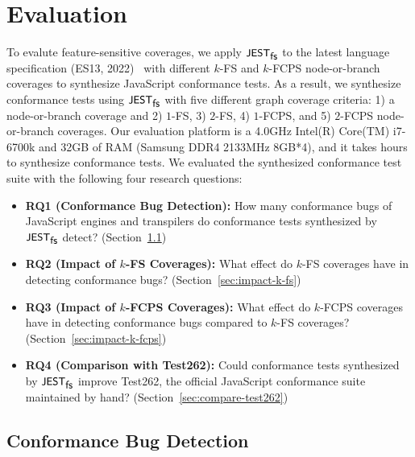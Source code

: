 \section{Evaluation}\label{sec:eval}

To evalute feature-sensitive coverages, we apply $\textsf{\small JEST}_{\textsf{\small fs}}$ to the latest language
specification (ES13, 2022)~\cite{es13} with different $k$-FS and $k$-FCPS
node-or-branch coverages to synthesize JavaScript conformance tests.
%
As a result, we synthesize  conformance tests using $\textsf{\small JEST}_{\textsf{\small fs}}$ with
five different graph coverage criteria: 1) a node-or-branch coverage and 2)
$1$-FS, 3) $2$-FS, 4) $1$-FCPS, and 5) $2$-FCPS node-or-branch coverages.
%
Our evaluation platform is a 4.0GHz Intel(R) Core(TM) i7-6700k and 32GB of RAM
(Samsung DDR4 2133MHz 8GB*4), and it takes  hours to synthesize
conformance tests.
%
We evaluated the synthesized conformance test suite with the following four
research questions:
\begin{itemize}
  \item \textbf{RQ1 (Conformance Bug Detection):} How many conformance bugs of
    JavaScript engines and transpilers do conformance tests synthesized by
    $\textsf{\small JEST}_{\textsf{\small fs}}$ detect? (Section~\ref{sec:conform-bug})
  \item \textbf{RQ2 (Impact of $k$-FS Coverages):} What effect do $k$-FS
    coverages have in detecting conformance bugs?
    (Section~\ref{sec:impact-k-fs})
  \item \textbf{RQ3 (Impact of $k$-FCPS Coverages):} What effect do $k$-FCPS
    coverages have in detecting conformance bugs compared to $k$-FS coverages?
    (Section~\ref{sec:impact-k-fcps})
  \item \textbf{RQ4 (Comparison with Test262):} Could conformance tests
    synthesized by $\textsf{\small JEST}_{\textsf{\small fs}}$ improve Test262, the official JavaScript conformance
    suite maintained by hand? (Section~\ref{sec:compare-test262})
\end{itemize}


\subsection{Conformance Bug Detection}\label{sec:conform-bug}

